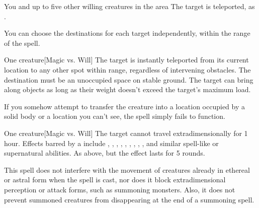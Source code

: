 \begin{spelltarget}{You and up to five other willing creatures in the area}
    \spelleffect The target is teleported, as .
\end{spelltarget}
\spellnotes You can choose the destinations for each target independently, within the range of the spell. 

\spellrng{\rngclose}
\begin{spelltarget}{One creature}[Magic vs. Will]
    \spelleffect The target is instantly teleported from its current location to any other spot within range, regardless of intervening obstacles. The destination must be an unoccupied space on stable ground. The target can bring along objects as long as their weight doesn't exceed the target's maximum load.
\end{spelltarget}
\spellnotes If you somehow attempt to transfer the creature into a location occupied by a solid body or a location you can't see, the spell simply fails to function.

\spellrng{\rngmed}
\begin{spelltarget}{One creature}[Magic vs. Will]
    \spellsuccess  The target cannot travel extradimensionally for 1 hour. Effects barred by a  include , , , , , , , , , and similar spell-like or supernatural abilities.
    \spellfailure As above, but the effect lasts for 5 rounds.
\end{spelltarget}
\spellnotes This spell does not interfere with the movement of creatures already in ethereal or astral form when the spell is cast, nor does it block extradimensional perception or attack forms, such as summoning monsters. Also, it does not prevent summoned creatures from disappearing at the end of a summoning spell.

